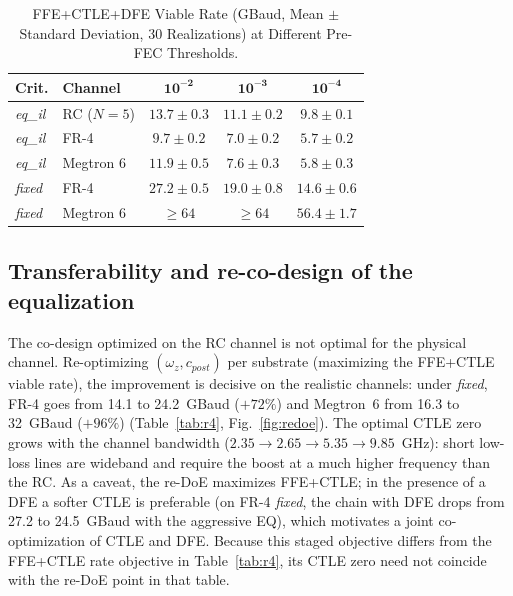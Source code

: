 \documentclass{ieeeaccess}
\begin{document}
\begin{table}[!t]
\caption{FFE+CTLE+DFE Viable Rate (GBaud, Mean $\pm$ Standard Deviation, 30
Realizations) at Different Pre-FEC Thresholds.}
\label{tab:rumbral}\centering
\begin{tabular}{llccc}
\hline
\textbf{Crit.} & \textbf{Channel} & $\mathbf{10^{-2}}$ & $\mathbf{10^{-3}}$ & $\mathbf{10^{-4}}$ \\
\hline
\textit{eq\_il} & RC ($N{=}5$)   & $13.7{\pm}0.3$ & $11.1{\pm}0.2$ & $9.8{\pm}0.1$ \\
\textit{eq\_il} & FR-4           & $9.7{\pm}0.2$  & $7.0{\pm}0.2$  & $5.7{\pm}0.2$ \\
\textit{eq\_il} & Megtron 6      & $11.9{\pm}0.5$ & $7.6{\pm}0.3$  & $5.8{\pm}0.3$ \\
\hline
\textit{fixed}  & FR-4           & $27.2{\pm}0.5$ & $19.0{\pm}0.8$ & $14.6{\pm}0.6$ \\
\textit{fixed}  & Megtron 6      & $\ge 64$       & $\ge 64$       & $56.4{\pm}1.7$ \\
\hline
\end{tabular}
\end{table}

\subsection{Transferability and re-co-design of the equalization}
The co-design optimized on the RC channel is not optimal for the physical
channel. Re-optimizing $(\omega_z, c_{post})$ per substrate (maximizing the
FFE+CTLE viable rate), the improvement is decisive on the realistic
channels: under \textit{fixed}, FR-4 goes from 14.1 to 24.2~GBaud ($+72\%$)
and Megtron~6 from 16.3 to 32~GBaud ($+96\%$) (Table~\ref{tab:r4},
Fig.~\ref{fig:redoe}). The optimal CTLE zero grows with the channel
bandwidth ($2.35\rightarrow2.65\rightarrow5.35\rightarrow9.85$~GHz): short
low-loss lines are wideband and require the boost at a much higher frequency
than the RC. As a caveat, the re-DoE maximizes FFE+CTLE; in the presence of
a DFE a softer CTLE is preferable (on FR-4 \textit{fixed}, the chain with
DFE drops from 27.2 to 24.5~GBaud with the aggressive EQ), which motivates a
joint co-optimization of CTLE and DFE. Because this staged objective differs
from the FFE+CTLE rate objective in Table~\ref{tab:r4}, its CTLE zero need
not coincide with the re-DoE point in that table.
\end{document}
